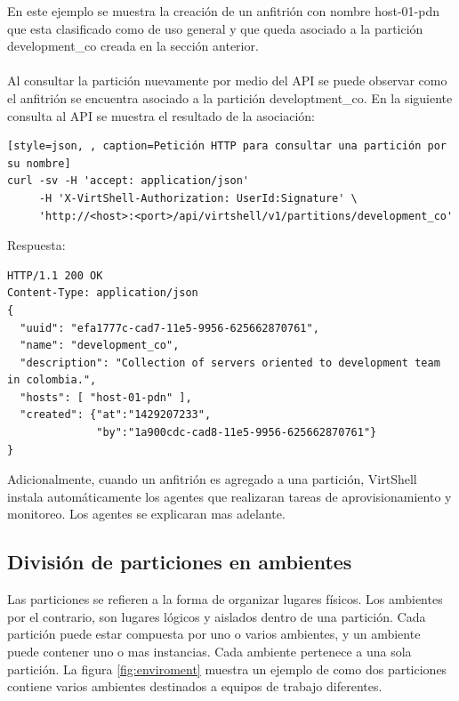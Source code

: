 \vspace{5mm}

En este ejemplo se muestra la creación de un anfitrión con nombre host-01-pdn que esta clasificado como de uso general y que queda asociado a la partición development\_co creada en la sección anterior.\\
\\
Al consultar la partición nuevamente por medio del API se puede observar como el anfitrión se encuentra asociado a la partición developtment\_co. En la siguiente consulta al API se muestra el resultado de la asociación:

\vspace{5mm} 

\begin{lstlisting}[style=json, , caption=Petición HTTP para consultar una partición por su nombre]
curl -sv -H 'accept: application/json' 
     -H 'X-VirtShell-Authorization: UserId:Signature' \ 
     'http://<host>:<port>/api/virtshell/v1/partitions/development_co'
\end{lstlisting}

\vspace{5mm}

Respuesta:

\vspace{5mm}

\begin{lstlisting}[style=json]
HTTP/1.1 200 OK
Content-Type: application/json
{
  "uuid": "efa1777c-cad7-11e5-9956-625662870761",
  "name": "development_co",
  "description": "Collection of servers oriented to development team in colombia.", 
  "hosts": [ "host-01-pdn" ],  
  "created": {"at":"1429207233", 
              "by":"1a900cdc-cad8-11e5-9956-625662870761"}
}
\end{lstlisting}

\vspace{5mm}

Adicionalmente, cuando un anfitrión es agregado a una partición, VirtShell instala automáticamente los agentes  que realizaran tareas de aprovisionamiento y monitoreo. Los agentes se explicaran mas adelante.

\subsection{División de particiones en ambientes}
Las particiones se refieren a la forma de organizar lugares físicos. Los ambientes por el contrario, son lugares lógicos y aislados dentro de una partición. Cada partición puede estar compuesta por uno o varios ambientes, y un ambiente puede contener uno o mas instancias. Cada ambiente pertenece a una sola partición. La figura \ref{fig:enviroment} muestra un ejemplo de como dos particiones contiene varios ambientes destinados a equipos de trabajo diferentes. \\

